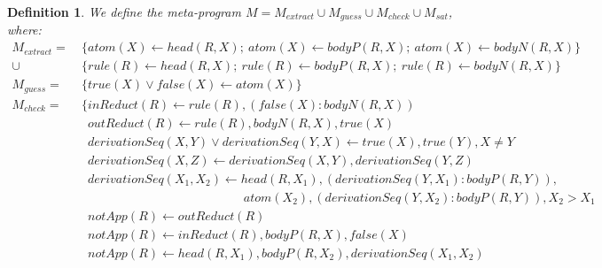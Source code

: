 \documentclass[11pt,fleqn,twoside]{article}
\newtheorem{definition}{Definition}
\begin{document}
			\begin{definition}
				\label{def:grewriting}
				We define the \emph{meta-program} $M = M_{\mathit{extract}} \cup M_{\mathit{guess}} \cup M_{\mathit{check}} \cup M_{\mathit{sat}}$, where:
				\allowdisplaybreaks
				\begin{align}
					M_{\mathit{extract}} =& \ \{ \mathit{atom}(X) \leftarrow \mathit{head}(R,X); \ \mathit{atom}(X) \leftarrow \mathit{bodyP}(R,X); \ \mathit{atom}(X) \leftarrow \mathit{bodyN}(R,X) \} \label{def:grewriting:0} \\
						\cup & \ \{ \mathit{rule}(R) \leftarrow \mathit{head}(R,X); \ \mathit{rule}(R) \leftarrow \mathit{bodyP}(R,X); \ \mathit{rule}(R) \leftarrow \mathit{bodyN}(R,X) \} \label{def:grewriting:0a} \\[0.9ex]
					M_{\mathit{guess}} =& \ \{ \mathit{true}(X) \vee \mathit{false}(X) \leftarrow \mathit{atom}(X) \} \label{def:grewriting:1} \\[0.9ex]
					M_{\mathit{check}} =& \ \{ \mathit{inReduct}(R) \leftarrow \mathit{rule}(R), (\mathit{false}(X) : \mathit{bodyN}(R,X))  \label{def:grewriting:2} \\
						& \phantom{\ \{} \mathit{outReduct}(R) \leftarrow \mathit{rule}(R), \mathit{bodyN}(R,X), \mathit{true}(X)  \label{def:grewriting:3} \\[0.6ex]						
						& \phantom{\ \{} \mathit{derivationSeq}(X, Y) \vee \mathit{derivationSeq}(Y, X) \leftarrow \mathit{true}(X), \mathit{true}(Y), X \not= Y \label{def:grewriting:3a} \\
						& \phantom{\ \{} \mathit{derivationSeq}(X, Z) \leftarrow \mathit{derivationSeq}(X, Y), \mathit{derivationSeq}(Y, Z) \label{def:grewriting:3b} \\[0.6ex]
						& \phantom{\ \{} \mathit{derivationSeq}(X_1, X_2) \leftarrow \mathit{head}(R, X_1), (\mathit{derivationSeq}(Y, X_1) : \mathit{bodyP}(R, Y)), \label{def:grewriting:3c} \\
						& \phantom{\ \{ \mathit{derivationSeq}(X_1, X_2) \leftarrow } \ \mathit{atom}(X_2), (\mathit{derivationSeq}(Y, X_2) : \mathit{bodyP}(R, Y)), X_2 > X_1 \nonumber \\[0.6ex]
						& \phantom{\ \{} \mathit{notApp}(R) \leftarrow \mathit{outReduct}(R)  \label{def:grewriting:7} \\
						& \phantom{\ \{} \mathit{notApp}(R) \leftarrow \mathit{inReduct}(R), \mathit{bodyP}(R,X), \mathit{false}(X)  \label{def:grewriting:8} \\
						& \phantom{\ \{} \mathit{notApp}(R) \leftarrow \mathit{head}(R, X_1), \mathit{bodyP}(R, X_2), \mathit{derivationSeq}(X_1, X_2)  \label{def:grewriting:9} \\[0.6ex]

\end{align}
\end{definition}
\end{document}
